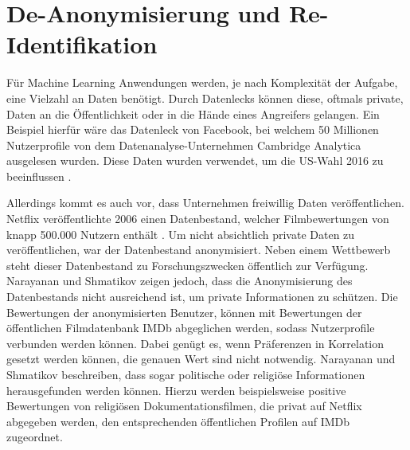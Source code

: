 \section{De-Anonymisierung und Re-Identifikation}\label{sec:deano}

Für Machine Learning Anwendungen werden, je nach Komplexität der Aufgabe, eine Vielzahl an Daten benötigt.
Durch Datenlecks können diese, oftmals private, Daten an die Öffentlichkeit oder in die Hände eines Angreifers gelangen.
Ein Beispiel hierfür wäre das Datenleck von Facebook, bei welchem 50 Millionen Nutzerprofile von dem Datenanalyse-Unternehmen Cambridge Analytica ausgelesen wurden. 
Diese Daten wurden verwendet, um die US-Wahl 2016 zu beeinflussen \cite{I-2}.

Allerdings kommt es auch vor, dass Unternehmen freiwillig Daten veröffentlichen. 
Netflix veröffentlichte 2006 einen Datenbestand, welcher Filmbewertungen von knapp 500.000 Nutzern enthält \cite{I-3}. 
Um nicht absichtlich private Daten zu veröffentlichen, war der Datenbestand anonymisiert.
Neben einem Wettbewerb steht dieser Datenbestand zu Forschungszwecken öffentlich zur Verfügung.
Narayanan und Shmatikov \cite{P-29} zeigen jedoch, dass die Anonymisierung des Datenbestands nicht ausreichend ist, um private Informationen zu schützen.
Die Bewertungen der anonymisierten Benutzer, können mit Bewertungen der öffentlichen Filmdatenbank IMDb abgeglichen werden, sodass Nutzerprofile verbunden werden können.
Dabei genügt es, wenn Präferenzen in Korrelation gesetzt werden können, die genauen Wert sind nicht notwendig.
Narayanan und Shmatikov \cite{P-29} beschreiben, dass sogar politische oder religiöse Informationen herausgefunden werden können.
Hierzu werden beispielsweise positive Bewertungen von religiösen Dokumentationsfilmen, die privat auf Netflix abgegeben werden, den entsprechenden öffentlichen Profilen auf IMDb zugeordnet.
